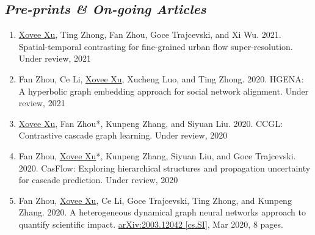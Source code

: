 \subsection*{\textnormal{\textit{Pre-prints \& On-going Articles}}}

\begin{enumerate}[resume]
    \item \underline{Xovee Xu}, Ting Zhong, Fan Zhou, Goce Trajcevski, and Xi Wu. 2021. Spatial-temporal contrasting for fine-grained urban flow super-resolution. Under review, 2021
    \item Fan Zhou, Ce Li, \underline{Xovee Xu}, Xucheng Luo, and Ting Zhong. 2020. HGENA: A hyperbolic graph embedding approach for social network alignment. Under review, 2021
    \item \underline{Xovee Xu}, Fan Zhou*, Kunpeng Zhang, and Siyuan Liu. 2020. CCGL: Contrastive cascade graph learning. Under review, 2020
    \item Fan Zhou, \underline{Xovee Xu}*, Kunpeng Zhang, Siyuan Liu, and Goce Trajcevski. 2020. CasFlow: Exploring hierarchical structures and propagation uncertainty for cascade prediction. Under review, 2020
    \item Fan Zhou, \underline{Xovee Xu}, Ce Li, Goce Trajcevski, Ting Zhong, and Kunpeng Zhang. 2020. A heterogeneous dynamical graph neural networks approach to quantify scientific impact. \href{https://arxiv.org/abs/2003.12042}{arXiv:2003.12042 [cs.SI]}, Mar 2020, 8 pages. 
\end{enumerate}